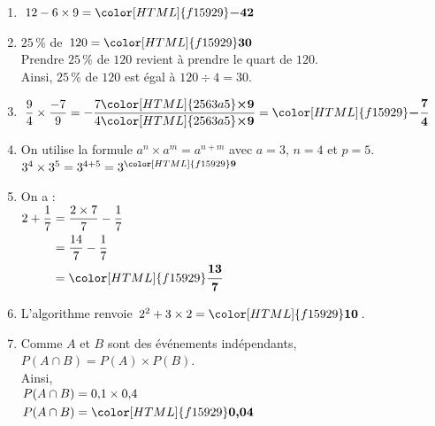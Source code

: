 \documentclass[a4paper,11pt,landscape,exos]{nsi} %
\begin{document}
\begin{multicols}{2}
\maketitle

\begin{enumerate}[itemsep=1em]
    \item $12-6\times9={\color[HTML]{f15929}\boldsymbol{-42}}$
\item $25\,\%$ de $120 = {\color[HTML]{f15929}\boldsymbol{30}}$\\ Prendre $25\,\%$  de $120$ revient à prendre le quart de $120$.\\
      Ainsi, $25\,\%$ de $120$ est égal à $120\div 4 =30$.
     
\item $\dfrac{9}{4}\times \dfrac{-7}{9}=-\dfrac{7{\color[HTML]{2563a5}\boldsymbol{\times9}} }{4{\color[HTML]{2563a5}\boldsymbol{\times9}}}={\color[HTML]{f15929}\boldsymbol{-\dfrac{7}{4}}}$
\item On utilise la formule $a^n\times a^m=a^{n+m}$ avec $a=3$, $n=4$ et $p=5$.\\
            $3^{4}\times 3^{5}=3^{4+5}=3^{{\color[HTML]{f15929}\boldsymbol{9}}}$
\item On a : \\$\begin{aligned}
      2+\dfrac{1}{7} &= \dfrac{2 \times 7}{7} - \dfrac{1}{7} \\
      &= \dfrac{14}{7} - \dfrac{1}{7}\\
      &  ={\color[HTML]{f15929}\boldsymbol{\dfrac{13}{7}}}
      \end{aligned}$
\item  L'algorithme renvoie $2^2+3\times2={\color[HTML]{f15929}\boldsymbol{10}}$.
\item  Comme $A$ et $B$ sont des événements indépendants,  $P(A\cap B)=P(A)\times  P(B)$.\\
Ainsi, \\
$\begin{aligned}
P(A\cap B)&=0{,}1 \times 0{,}4\\
P(A\cap B)&={\color[HTML]{f15929}\boldsymbol{0{,}04}}
\end{aligned}$
  

\end{enumerate}
\end{multicols}
\end{document}
